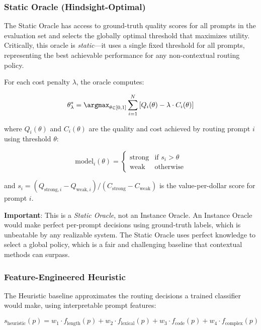 \subsubsection{Static Oracle (Hindsight-Optimal)}

The Static Oracle has access to ground-truth quality scores for all prompts in the evaluation set and selects the globally optimal threshold that maximizes utility. Critically, this oracle is \emph{static}—it uses a single fixed threshold for all prompts, representing the best achievable performance for any non-contextual routing policy.

For each cost penalty $\lambda$, the oracle computes:

\begin{equation}
    \theta^*_\lambda = \argmax_{\theta \in [0,1]} \sum_{i=1}^{N} \left[ Q_i(\theta) - \lambda \cdot C_i(\theta) \right]
\end{equation}

where $Q_i(\theta)$ and $C_i(\theta)$ are the quality and cost achieved by routing prompt $i$ using threshold $\theta$:

\begin{equation}
    \text{model}_i(\theta) = 
    \begin{cases}
        \text{strong} & \text{if } s_i > \theta \\
        \text{weak} & \text{otherwise}
    \end{cases}
\end{equation}

and $s_i = (Q_{\text{strong},i} - Q_{\text{weak},i}) / (C_{\text{strong}} - C_{\text{weak}})$ is the value-per-dollar score for prompt $i$.

\textbf{Important}: This is a \emph{Static Oracle}, not an Instance Oracle. An Instance Oracle would make perfect per-prompt decisions using ground-truth labels, which is unbeatable by any realizable system. The Static Oracle uses perfect knowledge to select a global policy, which is a fair and challenging baseline that contextual methods can surpass.

\subsubsection{Feature-Engineered Heuristic}

The Heuristic baseline approximates the routing decisions a trained classifier would make, using interpretable prompt features:

\begin{equation}
    s_{\text{heuristic}}(p) = w_1 \cdot f_{\text{length}}(p) + w_2 \cdot f_{\text{lexical}}(p) + w_3 \cdot f_{\text{code}}(p) + w_4 \cdot f_{\text{complex}}(p)
\end{equation}

